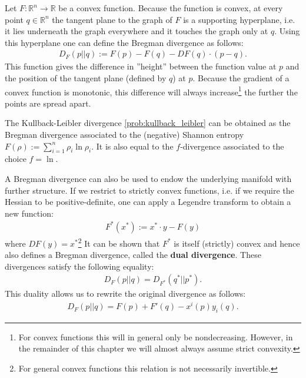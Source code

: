     \begin{definition}\label{info:bregman_divergence}
        Let $F:\mathbb{R}^n\rightarrow\mathbb{R}$ be a convex function. Because the function is convex, at every point $q\in\mathbb{R}^n$ the tangent plane to the graph of $F$ is a supporting hyperplane, i.e. it lies underneath the graph everywhere and it touches the graph only at $q$. Using this hyperplane one can define the Bregman divergence as follows:
        \begin{gather}
            D_F(p||q) := F(p) - F(q) - DF(q)\cdot(p-q).
        \end{gather}
        This function gives the difference in ''height'' between the function value at $p$ and the position of the tangent plane (defined by $q$) at $p$. Because the gradient of a convex function is monotonic, this difference will always increase\footnote{For convex functions this will in general only be nondecreasing. However, in the remainder of this chapter we will almost always assume strict convexity.} the further the points are spread apart.
    \end{definition}
    \begin{example}
        The Kullback-Leibler divergence \ref{prob:kullback_leibler} can be obtained as the Bregman divergence associated to the (negative) Shannon entropy $F(\rho) := \sum_{i=1}^n\rho_i\ln\rho_i$. It is also equal to the $f$-divergence associated to the choice $f=\ln$.
    \end{example}

    A Bregman divergence can also be used to endow the underlying manifold with further structure. If we restrict to strictly convex functions, i.e. if we require the Hessian to be positive-definite, one can apply a Legendre transform to obtain a new function:
    \begin{gather}
        \label{info:legendre}
        F^*(x^*) := x^*\cdot y - F(y)
    \end{gather}
    where $DF(y)=x^*$\footnote{For general convex functions this relation is not necessarily invertible.} It can be shown that $F^*$ is itself (strictly) convex and hence also defines a Bregman divergence, called the \textbf{dual divergence}. These divergences satisfy the following equality:
    \begin{gather}
        D_F(p||q) = D_{F^*}(q^*||p^*).
    \end{gather}
    This duality allows us to rewrite the original divergence as follows:
    \begin{gather}
        D_F(p||q) = F(p) + F'(q) - x^i(p)y_i(q).
    \end{gather}

